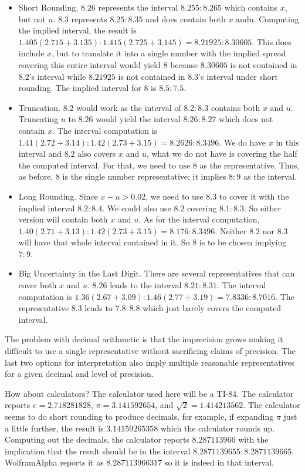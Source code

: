 \documentclass[12pt]{article}
\theoremstyle{remark}
\begin{document}
\begin{itemize}
    \item Short Rounding. $8.26$ represents the interval $8.255:8.265$ which contains $x$, but not $u$. $8.3$ represents $8.25:8.35$ and does contain both $x$ and$u$. Computing the implied interval, the result is $1.405(2.715 + 3.135):1.415(2.725 + 3.145)  = 8.21925:8.30605$. This does include $x$, but to translate it into a single number with the implied spread covering this entire interval would yield $8$ because $8.30605$ is not contained in $8.2$'s interval while $8.21925$ is not contained in $8.3$'s interval under short rounding. The implied interval for $8$ is $8.5:7.5$.
    \item Truncation. $8.2$ would work as the interval of $8.2:8.3$ contains both $x$ and $u$. Truncating $u$ to $8.26$ would yield the interval $8.26:8.27$ which does not contain $x$. The interval computation is $1.41(2.72+3.14):1.42(2.73+3.15)  = 8.2626:8.3496$. We do have $x$ in this interval and $8.2$ also covers $x$ and $u$, what we do not have is covering the half the computed interval. For that, we need to use $8$ as the representative. Thus, as before, $8$ is the single number representative; it implies $8:9$ as the interval. 
    \item Long Rounding. Since $x-u > 0.02$, we need to use $8.3$ to cover it with the implied interval $8.2:8.4$. We could also use $8.2$ covering $8.1:8.3$. So either version will contain both $x$ and $u$. As for the interval computation, $1.40(2.71+3.13): 1.42(2.73+3.15) = 8.176: 8.3496$. Neither $8.2$ nor $8.3$ will have that whole interval contained in it. So $8$ is to be chosen implying $7:9$. 
    \item Big Uncertainty in the Last Digit. There are several representatives that can cover both $x$ and $u$. $8.26$ leads to the interval $8.21:8.31$. The interval computation is $1.36(2.67+3.09): 1.46(2.77+3.19) = 7.8336:8.7016$. The representative $8.3$ leads to $7.8:8.8$ which just barely covers the computed interval.  
\end{itemize}

The problem with decimal arithmetic is that the imprecision grows making it difficult to use a single representative without sacrificing claims of precision. The last two options for interpretation also imply multiple reasonable representatives for a given decimal and level of precision. 

How about calculators? The calculator used here will be a TI-84. The calculator reports  $e = 2.718281828$, $\pi = 3.141592654$, and $\sqrt{2} = 1.414213562$. The calculator seems to do short rounding to produce decimals, for example, if expanding $\pi $ just a little further, the result is  $3.14159265358$ which the calculator rounds up. Computing out the decimals, the calculator reports $8.287113966$ with the implication that the result should be in the interval $8.2871139655:8.2871139665$.  WolframAlpha reports it as $8.287113966317$ so it is indeed in that interval. 
\end{document}

